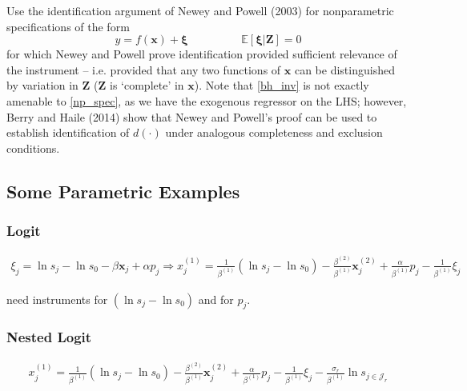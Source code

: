 \documentclass[11pt]{article}
\begin{document}
Use the identification argument of Newey and Powell (2003) for nonparametric specifications of the form
\begin{equation}
	\label{np_spec}
	y = f(\bm{x}) + \bm{\xi} \hspace{2cm} \mathbb{E}[\bm{\xi}| \bm{Z}] = 0
\end{equation}
for which Newey and Powell prove identification provided sufficient relevance of the instrument -- i.e. provided that any two functions of $\bm{x}$ can be distinguished by variation in $\bm{Z}$ ($\bm{Z}$ is `complete' in $\bm{x}$).
Note that \eqref{bh_inv} is not exactly amenable to \eqref{np_spec}, as we have the exogenous regressor on the LHS; however, Berry and Haile (2014) show that Newey and Powell's proof can be used to establish identification of $d(\cdot)$ under analogous completeness and exclusion conditions.

\subsection{Some Parametric Examples}

\subsubsection{Logit}

\begin{equation*}
	\begin{gathered}
			\xi_j = \ln s_j - \ln s_0 - \beta \bm{x}_j + \alpha p_j \Rightarrow x^{(1)}_j = \frac{1}{\beta^{(1)}}(\ln s_j - \ln s_0) - \frac{\beta^{(2)}}{\beta^{(1)}} \bm{x}^{(2)}_j + \frac{\alpha}{\beta^{(1)}} p_j -  \frac{1}{\beta^{(1)}} \xi_j
	\end{gathered}
\end{equation*}

need instruments for $(\ln s_j - \ln s_0)$ and for $p_j$.

\subsubsection{Nested Logit}

\begin{equation*}
	\begin{gathered}
			x^{(1)}_j = \frac{1}{\beta^{(1)}}(\ln s_j - \ln s_0) - \frac{\beta^{(2)}}{\beta^{(1)}} \bm{x}^{(2)}_j + \frac{\alpha}{\beta^{(1)}} p_j -  \frac{1}{\beta^{(1)}} \xi_j - \frac{\sigma_r}{\beta^{(1)}} \ln s_{j \in \mathscr{J}_r}
	\end{gathered}
\end{equation*}
\end{document}
